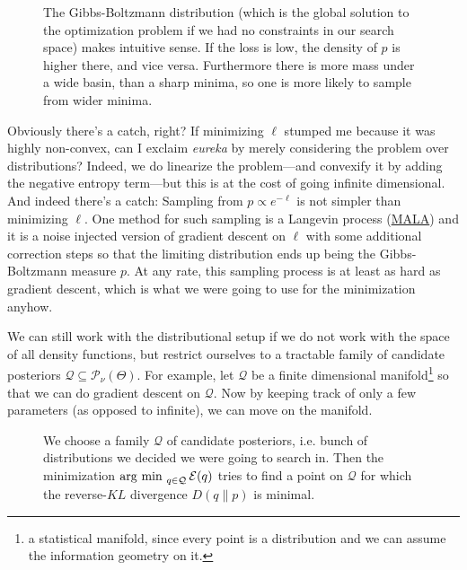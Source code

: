 \documentclass[12pt]{amsart}
\begin{document}
\begin{figure}
\centering

\caption*{The Gibbs-Boltzmann distribution (which is the global solution to the optimization problem if we had no constraints in our search space) makes intuitive sense. If the loss is low, the density of $p$ is higher there, and vice versa. Furthermore there is more mass under a wide basin, than a sharp minima, so one is more likely to sample from wider minima.}
\end{figure}

Obviously there's a catch, right? If minimizing $\ell$ stumped me because it was highly non-convex, can I exclaim \emph{eureka} by merely considering the problem over distributions? Indeed, we do linearize the problem---and convexify it by adding the negative entropy term---but this is at the cost of going infinite dimensional. And indeed there's a catch: Sampling from $p\propto e^{-\ell}$ is not simpler than minimizing $\ell$. One method for such sampling is a Langevin process (\href{https://en.wikipedia.org/wiki/Metropolis-adjusted_Langevin_algorithm}{MALA}) and it is a noise injected version of gradient descent on $\ell$ with some additional correction steps so that the limiting distribution ends up being the Gibbs-Boltzmann measure $p$. At any rate, this sampling process is at least as hard as gradient descent, which is what we were going to use for the minimization anyhow.

We can still work with the distributional setup if we do not work with the space of all density functions, but restrict ourselves to a tractable family of candidate posteriors $\mathcal{Q} \subseteq \mathcal{P}_\nu(\Theta)$. For example, let $\mathcal{Q}$ be a finite dimensional manifold\footnote{a statistical manifold, since every point is a distribution and we can assume the information geometry on it.} so that we can do gradient descent on $\mathcal{Q}$. Now by keeping track of only a few parameters (as opposed to infinite), we can move on the manifold. 

\begin{figure}[ht!]
\centering

\caption*{We choose a family $\mathcal{Q}$ of candidate posteriors, i.e. bunch of distributions we decided we were going to search in. Then the minimization $\operatorname*{\arg\,\min\,\,}_{q \in \mathcal{Q}} \mathcal{E}(q)$ tries to find a point on $\mathcal{Q}$ for which the reverse-$KL$ divergence $D(q\|p)$ is minimal.}
\end{figure}
\end{document}
